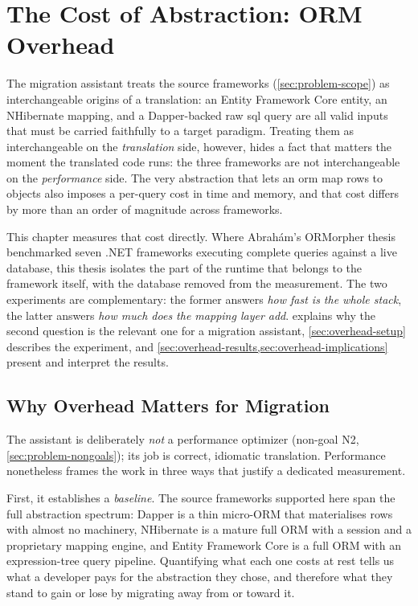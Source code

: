 \chapter{The Cost of Abstraction: ORM Overhead}
\label{chap:overhead}

The migration assistant treats the source frameworks (\cref{sec:problem-scope}) as interchangeable origins of a translation: an Entity Framework Core entity, an NHibernate mapping, and a Dapper-backed raw \acrshort{sql} query are all valid inputs that must be carried faithfully to a target paradigm. Treating them as interchangeable on the \emph{translation} side, however, hides a fact that matters the moment the translated code runs: the three frameworks are not interchangeable on the \emph{performance} side. The very abstraction that lets an \acrshort{orm} map rows to objects also imposes a per-query cost in time and memory, and that cost differs by more than an order of magnitude across frameworks.

This chapter measures that cost directly. Where Abrahám's ORMorpher thesis~\cite{abrahamFrameworkAgnosticQueryAdaptation2025} benchmarked seven .NET frameworks executing complete queries against a live database, this thesis isolates the part of the runtime that belongs to the framework itself, with the database removed from the measurement. The two experiments are complementary: the former answers \emph{how fast is the whole stack}, the latter answers \emph{how much does the mapping layer add}.  explains why the second question is the relevant one for a migration assistant, \cref{sec:overhead-setup} describes the experiment, and \cref{sec:overhead-results,sec:overhead-implications} present and interpret the results.

\section{Why Overhead Matters for Migration}
\label{sec:overhead-motivation}

The assistant is deliberately \emph{not} a performance optimizer (non-goal N2, \cref{sec:problem-nongoals}); its job is correct, idiomatic translation. Performance nonetheless frames the work in three ways that justify a dedicated measurement.

First, it establishes a \emph{baseline}. The source frameworks supported here span the full abstraction spectrum: Dapper is a thin micro-ORM that materialises rows with almost no machinery, NHibernate is a mature full ORM with a session and a proprietary mapping engine, and Entity Framework Core is a full ORM with an expression-tree query pipeline. Quantifying what each one costs at rest tells us what a developer pays for the abstraction they chose, and therefore what they stand to gain or lose by migrating away from or toward it.

